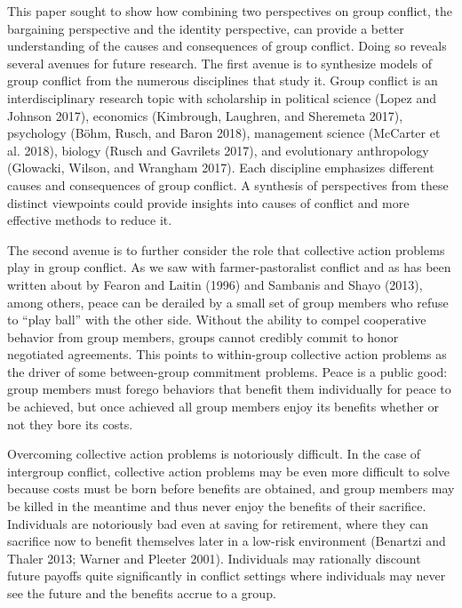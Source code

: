 \documentclass[11pt]{article}
\begin{document}
This paper sought to show how combining two perspectives on group
conflict, the bargaining perspective and the identity perspective, can
provide a better understanding of the causes and consequences of group
conflict. Doing so reveals several avenues for future research. The
first avenue is to synthesize models of group conflict from the numerous
disciplines that study it. Group conflict is an interdisciplinary
research topic with scholarship in political science (Lopez and Johnson
2017), economics (Kimbrough, Laughren, and Sheremeta 2017), psychology
(Böhm, Rusch, and Baron 2018), management science (McCarter et al.
2018), biology (Rusch and Gavrilets 2017), and evolutionary anthropology
(Glowacki, Wilson, and Wrangham 2017). Each discipline emphasizes
different causes and consequences of group conflict. A synthesis of
perspectives from these distinct viewpoints could provide insights into
causes of conflict and more effective methods to reduce it.

The second avenue is to further consider the role that collective action
problems play in group conflict. As we saw with farmer-pastoralist
conflict and as has been written about by Fearon and Laitin (1996) and
Sambanis and Shayo (2013), among others, peace can be derailed by a
small set of group members who refuse to ``play ball'' with the other
side. Without the ability to compel cooperative behavior from group
members, groups cannot credibly commit to honor negotiated agreements.
This points to within-group collective action problems as the driver of
some between-group commitment problems. Peace is a public good: group
members must forego behaviors that benefit them individually for peace
to be achieved, but once achieved all group members enjoy its benefits
whether or not they bore its costs.

Overcoming collective action problems is notoriously difficult. In the
case of intergroup conflict, collective action problems may be even more
difficult to solve because costs must be born before benefits are
obtained, and group members may be killed in the meantime and thus never
enjoy the benefits of their sacrifice. Individuals are notoriously bad
even at saving for retirement, where they can sacrifice now to benefit
themselves later in a low-risk environment (Benartzi and Thaler 2013;
Warner and Pleeter 2001). Individuals may rationally discount future
payoffs quite significantly in conflict settings where individuals may
never see the future and the benefits accrue to a group.
\end{document}
